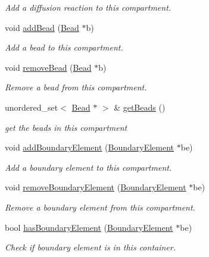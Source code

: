 \begin{DoxyCompactItemize}
\begin{DoxyCompactList}\small\item\em Add a diffusion reaction to this compartment. \end{DoxyCompactList}\item 
void \hyperlink{classCompartment_a5a4a2e9ca3eb7c51b01e7ff6e7b2f38a}{add\+Bead} (\hyperlink{classBead}{Bead} $\ast$b)
\begin{DoxyCompactList}\small\item\em Add a bead to this compartment. \end{DoxyCompactList}\item 
void \hyperlink{classCompartment_a693313a08cc84b7da667ca3c8d1886fa}{remove\+Bead} (\hyperlink{classBead}{Bead} $\ast$b)
\begin{DoxyCompactList}\small\item\em Remove a bead from this compartment. \end{DoxyCompactList}\item 
unordered\+\_\+set$<$ \hyperlink{classBead}{Bead} $\ast$ $>$ \& \hyperlink{classCompartment_aa02b9ef648f4e86ebb7e533d349f3943}{get\+Beads} ()
\begin{DoxyCompactList}\small\item\em get the beads in this compartment \end{DoxyCompactList}\item 
void \hyperlink{classCompartment_ab2467905fdf5783fd4c7a768f4d2fe09}{add\+Boundary\+Element} (\hyperlink{classBoundaryElement}{Boundary\+Element} $\ast$be)
\begin{DoxyCompactList}\small\item\em Add a boundary element to this compartment. \end{DoxyCompactList}\item 
void \hyperlink{classCompartment_a3e2df6771a3a3ada60512292f8c20435}{remove\+Boundary\+Element} (\hyperlink{classBoundaryElement}{Boundary\+Element} $\ast$be)
\begin{DoxyCompactList}\small\item\em Remove a boundary element from this compartment. \end{DoxyCompactList}\item 
bool \hyperlink{classCompartment_ada1b4df7834781271050ace7f523a114}{has\+Boundary\+Element} (\hyperlink{classBoundaryElement}{Boundary\+Element} $\ast$be)
\begin{DoxyCompactList}\small\item\em Check if boundary element is in this container. \end{DoxyCompactList}\item 

\end{DoxyCompactItemize}
